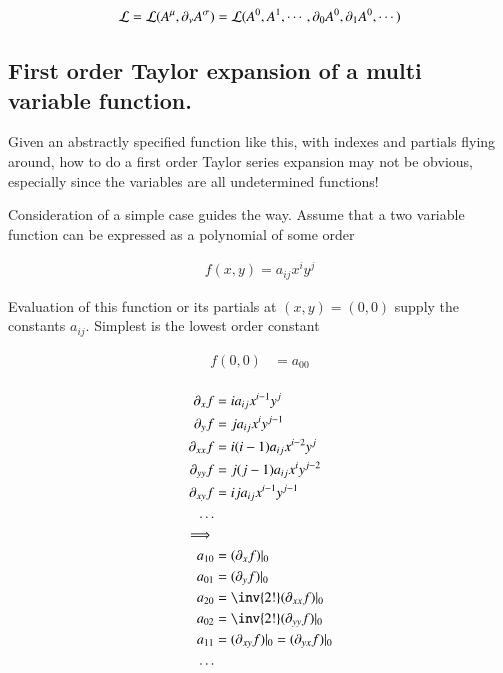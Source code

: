 \documentclass{article}
\begin{document}
\begin{align}
\mathcal{L} = \mathcal{L}( A^\mu, \partial_\nu A^\sigma) = \mathcal{L}(A^0, A^1, \cdots, \partial_0 A^0, \partial_1 A^0, \cdots )
\end{align}

\subsection{ First order Taylor expansion of a multi variable function. }

Given an abstractly specified function like this, with indexes and partials flying around, how to do a first order Taylor series expansion may not be obvious, especially since the variables are all undetermined functions!

Consideration of a simple case guides the way.  Assume that a two variable function can be expressed as a polynomial of some order

\begin{align*}
f(x,y) = a_{i j} x^i y^j
\end{align*}

Evaluation of this function or its partials at $(x,y) = (0,0)$ supply the constants $a_{i j}$.  Simplest is the lowest order constant

\begin{align*}
f(0,0) &= a_{0 0} \\
\end{align*}

\begin{align*}
\partial_x f &= i a_{i j} x^{i-1} y^j \\
\partial_y f &= j a_{i j} x^{i} y^{j-1} \\
\partial_{xx} f &= i(i-1) a_{i j} x^{i-2} y^j \\
\partial_{yy} f &= j(j-1) a_{i j} x^{i} y^{j-2} \\
\partial_{xy} f &= i j a_{i j} x^{i-1} y^{j-1} \\
\hdots \\
\implies \\
a_{1 0} &= (\partial_x f) \vert_0 \\
a_{0 1} &= (\partial_y f) \vert_0 \\
a_{2 0} &= \inv{2!} (\partial_{xx} f) \vert_0 \\
a_{0 2} &= \inv{2!} (\partial_{yy} f) \vert_0 \\
a_{1 1} &= (\partial_{xy} f) \vert_0 = (\partial_{yx} f) \vert_0 \\
\hdots
\end{align*}
\end{document}
